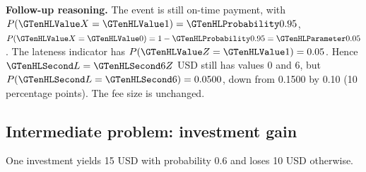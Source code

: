 \textbf{Follow-up reasoning.} The event is still on-time payment, with $P(\Indicator{X}=\Indicator{1})=\SuccessProb{0.95}$, $P(\Indicator{X}=\Indicator{0})=1-\SuccessProb{0.95}=\FailureProb{0.05}$. The lateness indicator has $P(\Indicator{Z}=\Indicator{1})=0.05$. Hence $\Money{L}=\Money{6}Z$ USD still has values 0 and 6, but $P(\Money{L}=\Money{6})=0.0500$, down from 0.1500 by 0.10 (10 percentage points). The fee size is unchanged.

\clearpage
\subsection{Intermediate problem: investment gain}\label{prob:c3-gain}
One investment yields 15 USD with probability 0.6 and loses 10 USD otherwise.


